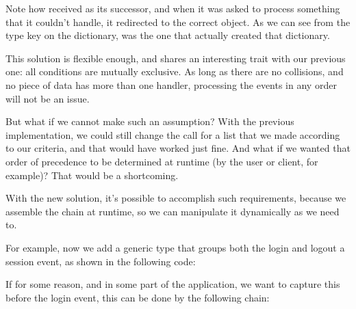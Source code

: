 \documentclass[a4paper,10pt,english]{sphinxmanual}
\begin{document}
Note how  received  as its successor, and when it was asked to
process something that it couldn’t handle, it redirected to the correct object. As we can see
from the type key on the dictionary,  was the one that actually created that
dictionary.

This solution is flexible enough, and shares an interesting trait with our previous one: all
conditions are mutually exclusive. As long as there are no collisions, and no piece of data
has more than one handler, processing the events in any order will not be an issue.

But what if we cannot make such an assumption? With the previous implementation, we
could still change the  call for a list that we made according to our
criteria, and that would have worked just fine. And what if we wanted that order of
precedence to be determined at runtime (by the user or client, for example)? That would be
a shortcoming.

With the new solution, it’s possible to accomplish such requirements, because we assemble
the chain at runtime, so we can manipulate it dynamically as we need to.

For example, now we add a generic type that groups both the login and logout a session
event, as shown in the following code:

\begin{sphinxVerbatim}[commandchars=\\\{\}]
 
      
\end{sphinxVerbatim}

If for some reason, and in some part of the application, we want to capture this before the
login event, this can be done by the following chain:

\begin{sphinxVerbatim}[commandchars=\\\{\}]
  
\end{sphinxVerbatim}
\end{document}
